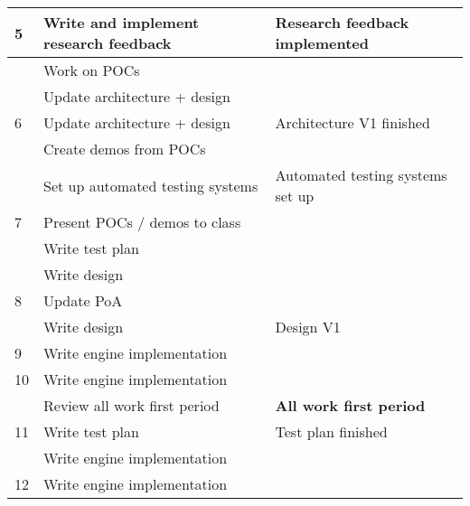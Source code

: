 \documentclass{article} %
\begin{document}
\begin{longtable}{|l|p{}|p{}|}
    5                    & Write and implement research feedback     & Research feedback implemented           \\ \hline
                         & Work on POCs                              &                                         \\ \hline
                         & Update architecture + design              &                                         \\ \hline
    6                    & Update architecture + design              & Architecture V1 finished                \\ \hline
                         & Create demos from POCs                    &                                         \\ \hline
                         & Set up automated testing systems          & Automated testing systems set up        \\ \hline
    7                    & Present POCs / demos to class             &                                         \\ \hline
                         & Write test plan                           &                                         \\ \hline
                         & Write design                              &                                         \\ \hline
    8                    & Update PoA                                &                                         \\ \hline
                         & Write design                              & Design V1                               \\ \hline
    9                    & Write engine implementation               &                                         \\ \hline
    10                   & Write engine implementation               &                                         \\ \hline
                         & Review all work first period              & \textbf{All work first period}          \\ \hline
    11                   & Write test plan                           & Test plan finished                      \\ \hline
                         & Write engine implementation               &                                         \\ \hline
    12                   & Write engine implementation               &                                         \\ \hline

\end{longtable}
\end{document}
